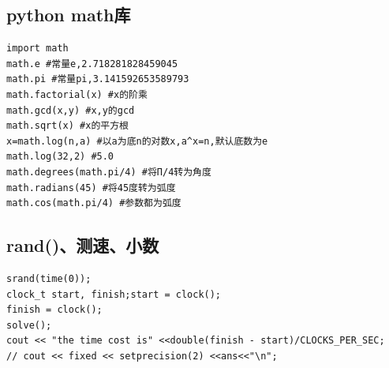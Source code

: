 \documentclass[12pt, a4paper, oneside]{ctexart}
\begin{document}
\subsection{python math库} 
\begin{lstlisting}
import math
math.e #常量e,2.718281828459045
math.pi #常量pi,3.141592653589793
math.factorial(x) #x的阶乘
math.gcd(x,y) #x,y的gcd
math.sqrt(x) #x的平方根
x=math.log(n,a) #以a为底n的对数x,a^x=n,默认底数为e
math.log(32,2) #5.0
math.degrees(math.pi/4) #将Π/4转为角度
math.radians(45) #将45度转为弧度
math.cos(math.pi/4) #参数都为弧度

\end{lstlisting}



\subsection{rand()、测速、小数} 
\begin{lstlisting}
srand(time(0));
clock_t start, finish;start = clock();
finish = clock();
solve();
cout << "the time cost is" <<double(finish - start)/CLOCKS_PER_SEC;
// cout << fixed << setprecision(2) <<ans<<"\n";
\end{lstlisting}
\end{document}
